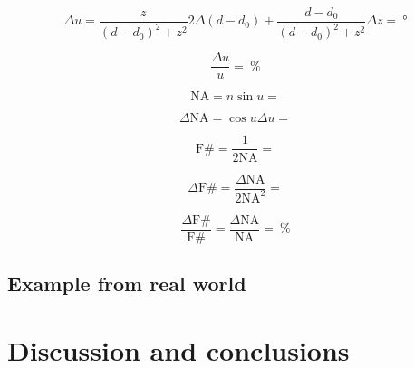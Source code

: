 \documentclass[a4paper, 12pt]{paper}
\begin{document}
\begin{equation}
    \Delta u = \frac{z}{{\left(d-d_0\right)}^2 + z^2} 2 \Delta \left(d-d_0\right)
    + \frac{d-d_0}{{\left(d-d_0\right)}^2 + z^2} \Delta z = \SI{}{\degree}
    \label{equ:acceptance_angle_err}
\end{equation}

\begin{equation}
    \frac{\Delta u}{u} = \SI{}{\percent}
    \label{equ:acceptance_angle_err_percent}
\end{equation}

\begin{equation}
    \mbox{NA} = n \sin{u} = 
    \label{equ:numerical_aperture}
\end{equation}

\begin{equation}
    \Delta \mbox{NA} = \cos{u} \Delta u = 
    \label{equ:numerical_aperture_err}
\end{equation}

\begin{equation}
    \mbox{F\#} = \frac{1}{2 \mbox{NA}} = 
    \label{equ:f_number}
\end{equation}

\begin{equation}
    \Delta \mbox{F\#} = \frac{\Delta \mbox{NA}}{2 \mbox{NA}^2}  = 
    \label{equ:f_number_err}
\end{equation}

\begin{equation}
    \frac{\Delta \mbox{F\#}}{\mbox{F\#}} = \frac{\Delta \mbox{NA}}{\mbox{NA}}
        = \SI{}{\percent}
    \label{equ:f_number_err_precent}
\end{equation}

\subsection{Example from real world}


\section{Discussion and conclusions}
\lipsum[6]
\end{document}
